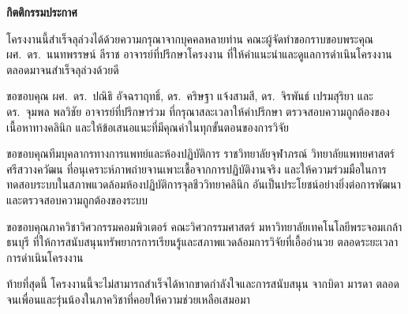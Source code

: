 \clearpage
{}
{}

\begin{center}\textbf{กิตติกรรมประกาศ}\end{center}

\hspace{\parindent}%
โครงงานนี้สำเร็จลุล่วงได้ด้วยความกรุณาจากบุคคลหลายท่าน
คณะผู้จัดทำขอกราบขอบพระคุณ ผศ.\ ดร.\ นนทพรรษน์ ลีราช อาจารย์ที่ปรึกษาโครงงาน
ที่ให้คำแนะนำและดูแลการดำเนินโครงงานตลอดมาจนสำเร็จลุล่วงด้วยดี

ขอขอบคุณ ผศ.\ ดร.\ ปณิธิ อัจฉราฤทธิ์, ดร.\ คริษฐา แจ้งสามสี,
ดร.\ จิรพันธ์ เปรมสุริยา และ ดร.\ จุมพล พลวิชัย
อาจารย์ที่ปรึกษาร่วม ที่กรุณาสละเวลาให้คำปรึกษา
ตรวจสอบความถูกต้องของเนื้อหาทางคลินิก และให้ข้อเสนอแนะที่มีคุณค่าในทุกขั้นตอนของการวิจัย

ขอขอบคุณทีมบุคลากรทางการแพทย์และห้องปฏิบัติการ
ราชวิทยาลัยจุฬาภรณ์ วิทยาลัยแพทยศาสตร์ศรีสวางควัฒน
ที่อนุเคราะห์ภาพถ่ายจานเพาะเชื้อจากการปฏิบัติงานจริง
และให้ความร่วมมือในการทดสอบระบบในสภาพแวดล้อมห้องปฏิบัติการจุลชีววิทยาคลินิก
อันเป็นประโยชน์อย่างยิ่งต่อการพัฒนาและตรวจสอบความถูกต้องของระบบ

ขอขอบคุณภาควิชาวิศวกรรมคอมพิวเตอร์ คณะวิศวกรรมศาสตร์
มหาวิทยาลัยเทคโนโลยีพระจอมเกล้าธนบุรี
ที่ให้การสนับสนุนทรัพยากรการเรียนรู้และสภาพแวดล้อมการวิจัยที่เอื้ออำนวย
ตลอดระยะเวลาการดำเนินโครงงาน

ท้ายที่สุดนี้ โครงงานนี้จะไม่สามารถสำเร็จได้หากขาดกำลังใจและการสนับสนุน
จากบิดา มารดา ตลอดจนเพื่อนและรุ่นน้องในภาควิชาที่คอยให้ความช่วยเหลือเสมอมา

\newpage
